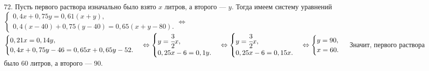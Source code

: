 72. Пусть первого раствора изначально было взято $x$ литров, а второго --- $y.$ Тогда имеем систему уравнений $\begin{cases} 0,4x+0,75y=0,61(x+y),\\
0,4(x-40)+0,75(y-40)=0,65(x+y-80).\end{cases}\Leftrightarrow$\\$\begin{cases} 0,21x=0,14y,\\
0,4x+0,75y-46=0,65x+0,65y-52.\end{cases}\Leftrightarrow\begin{cases} y=\cfrac{3}{2}x,\\
0,25x-6=0,1y.\end{cases}\Leftrightarrow\begin{cases} y=\cfrac{3}{2}x,\\
0,25x-6=0,15x.\end{cases}\Leftrightarrow\begin{cases} y=90,\\
x=60.\end{cases}$ Значит, первого раствора было 60 литров, а второго --- 90.\\
